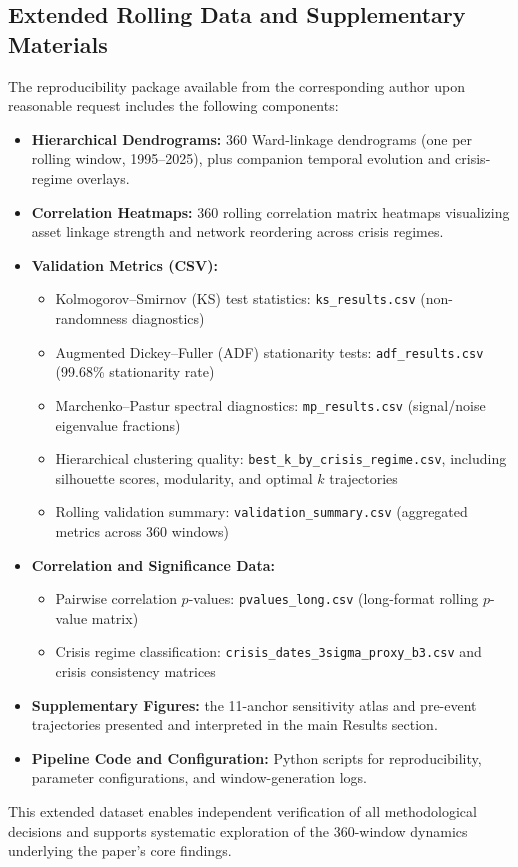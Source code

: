 \documentclass[a4paper,fleqn,review]{cas-sc}
\begin{document}
\subsection{Extended Rolling Data and Supplementary Materials}

The reproducibility package available from the corresponding author upon reasonable request includes the following components:

\begin{itemize}
\item \textbf{Hierarchical Dendrograms:} 360 Ward-linkage dendrograms (one per rolling window, 1995--2025), plus companion temporal evolution and crisis-regime overlays.
\item \textbf{Correlation Heatmaps:} 360 rolling correlation matrix heatmaps visualizing asset linkage strength and network reordering across crisis regimes.
\item \textbf{Validation Metrics (CSV):}
    \begin{itemize}
    \item Kolmogorov--Smirnov (KS) test statistics: \texttt{ks\_results.csv} (non-randomness diagnostics)
    \item Augmented Dickey--Fuller (ADF) stationarity tests: \texttt{adf\_results.csv} (99.68\% stationarity rate)
    \item Marchenko--Pastur spectral diagnostics: \texttt{mp\_results.csv} (signal/noise eigenvalue fractions)
    \item Hierarchical clustering quality: \texttt{best\_k\_by\_crisis\_regime.csv}, including silhouette scores, modularity, and optimal $k$ trajectories
    \item Rolling validation summary: \texttt{validation\_summary.csv} (aggregated metrics across 360 windows)
    \end{itemize}
\item \textbf{Correlation and Significance Data:}
    \begin{itemize}
    \item Pairwise correlation $p$-values: \texttt{pvalues\_long.csv} (long-format rolling $p$-value matrix)
    \item Crisis regime classification: \texttt{crisis\_dates\_3sigma\_proxy\_b3.csv} and crisis consistency matrices
    \end{itemize}
\item \textbf{Supplementary Figures:} the 11-anchor sensitivity atlas and pre-event trajectories presented and interpreted in the main Results section.
\item \textbf{Pipeline Code and Configuration:} Python scripts for reproducibility, parameter configurations, and window-generation logs.
\end{itemize}

This extended dataset enables independent verification of all methodological decisions and supports systematic exploration of the 360-window dynamics underlying the paper's core findings.



\end{document}
